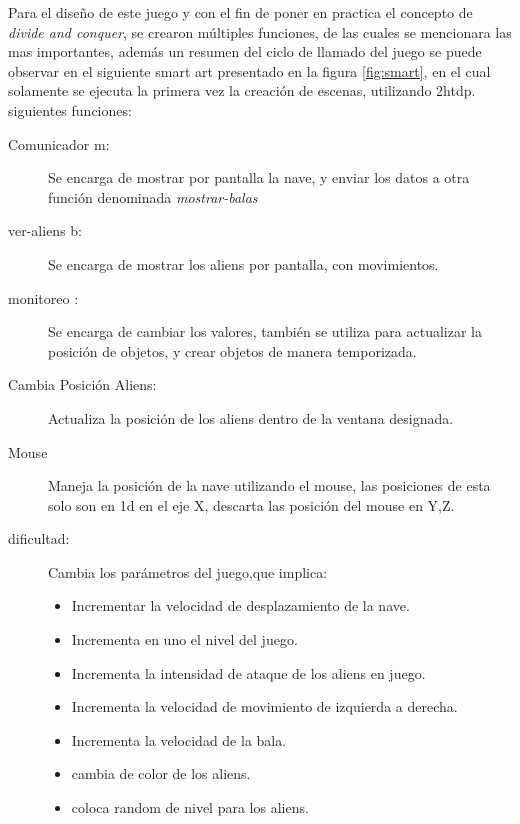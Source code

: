 \documentclass[a4paper]{article} %
\begin{document}
Para el diseño de este juego y con el fin de poner en practica el concepto de \textit{divide and conquer}, se crearon múltiples funciones, de las cuales se mencionara las mas importantes, además un resumen del ciclo de llamado del juego se puede observar en el siguiente smart art presentado en la figura \ref{fig:smart}, en el cual solamente se ejecuta la primera vez la creación de escenas, utilizando 2htdp.
siguientes funciones:
\begin{description}
    \item[Comunicador m:] Se encarga de mostrar por pantalla la nave, y enviar los datos a otra función denominada \textit{mostrar-balas}
    \item[ver-aliens b:] Se encarga de mostrar los aliens por pantalla, con movimientos.
    \item[monitoreo :]Se encarga de cambiar los valores, también se utiliza para actualizar la posición de objetos, y crear objetos de manera temporizada. 
    \item[Cambia Posición Aliens:]Actualiza la posición de los aliens dentro de la ventana designada.	
    \item[Mouse] Maneja la posición de la nave utilizando el mouse, las posiciones de esta solo son en 1d 
        en el eje X, descarta las posición del mouse en Y,Z.
    \item[dificultad:]Cambia los parámetros del juego,que implica:
      \begin{itemize}
      \item Incrementar la velocidad de desplazamiento de la nave.
      \item Incrementa en uno el nivel del juego.
      \item Incrementa la intensidad de ataque de los aliens en juego.
      \item Incrementa la velocidad de movimiento de izquierda a derecha.
      \item Incrementa la velocidad de la bala.
      \item cambia de color de los aliens.
      \item coloca random de nivel para los aliens.
     \end{itemize}
\end{description}
\end{document}
